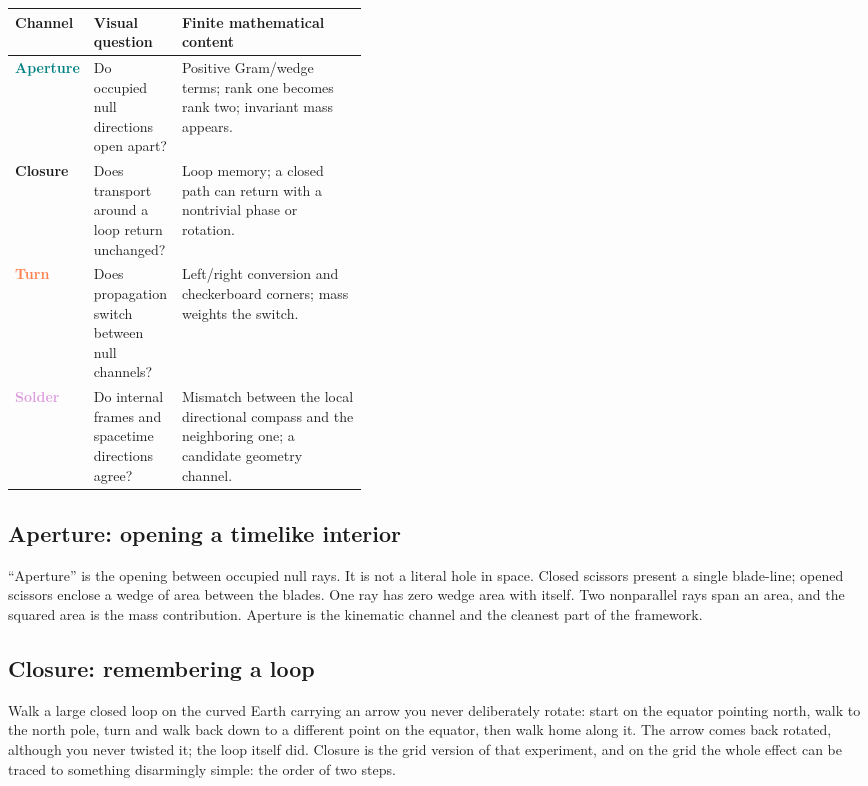 \documentclass[11pt]{article}
\begin{document}
\begin{center}
\begin{tabularx}{0.96\linewidth}{@{}>{\bfseries}p{0.16\linewidth}p{0.25\linewidth}X@{}}
\toprule
Channel & Visual question & Finite mathematical content\\
\midrule
\textcolor{teal}{Aperture} & Do occupied null directions open apart? &
Positive Gram/wedge terms; rank one becomes rank two; invariant mass appears.\\
\textcolor{gold!80!black}{Closure} & Does transport around a loop return unchanged? &
Loop memory; a closed path can return with a nontrivial phase or rotation.\\
\textcolor{coral}{Turn} & Does propagation switch between null channels? &
Left/right conversion and checkerboard corners; mass weights the switch.\\
\textcolor{plum}{Solder} & Do internal frames and spacetime directions agree? &
Mismatch between the local directional compass and the neighboring one; a
candidate geometry channel.\\
\bottomrule
\end{tabularx}
\end{center}

\subsection{Aperture: opening a timelike interior}

``Aperture'' is the opening between occupied null rays.  It is not a literal
hole in space.  Closed scissors present a single blade-line; opened scissors
enclose a wedge of area between the blades.  One ray has zero wedge area with
itself.  Two nonparallel rays
span an area, and the squared area is the mass contribution.  Aperture is the
kinematic channel and the cleanest part of the framework.

\subsection{Closure: remembering a loop}

Walk a large closed loop on the curved Earth carrying an arrow you never
deliberately rotate: start on the equator pointing north, walk to the north
pole, turn and walk back down to a different point on the equator, then walk
home along it.  The arrow comes back rotated, although you never twisted it;
the loop itself did.  Closure is the grid version of that experiment, and on
the grid the whole effect can be traced to something disarmingly simple: the
order of two steps.
\end{document}
